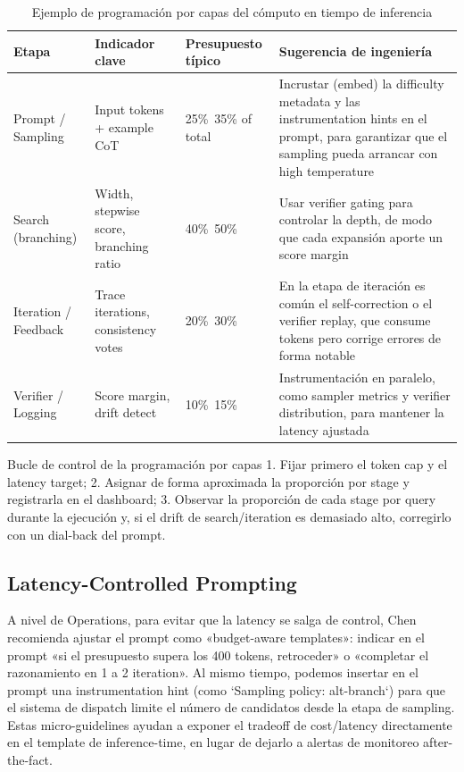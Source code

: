 \begin{table}[H]
\centering
\caption{Ejemplo de programación por capas del cómputo en tiempo de inferencia}
\begin{tabular}{p{}p{}p{}p{}}
\toprule
Etapa & Indicador clave & Presupuesto típico & Sugerencia de ingeniería \\
\midrule
Prompt / Sampling & Input tokens + example CoT & 25\%~35\% of total & Incrustar (embed) la difficulty metadata y las instrumentation hints en el prompt, para garantizar que el sampling pueda arrancar con high temperature \\
Search (branching) & Width, stepwise score, branching ratio & 40\%~50\% & Usar verifier gating para controlar la depth, de modo que cada expansión aporte un score margin \\
Iteration / Feedback & Trace iterations, consistency votes & 20\%~30\% & En la etapa de iteración es común el self-correction o el verifier replay, que consume tokens pero corrige errores de forma notable \\
Verifier / Logging & Score margin, drift detect & 10\%~15\% & Instrumentación en paralelo, como sampler metrics y verifier distribution, para mantener la latency ajustada \\
\bottomrule
\end{tabular}
\end{table}

\begin{knowledgebox}{Bucle de control de la programación por capas}
1. Fijar primero el token cap y el latency target; 2. Asignar de forma aproximada la proporción por stage y registrarla en el dashboard; 3. Observar la proporción de cada stage por query durante la ejecución y, si el drift de search/iteration es demasiado alto, corregirlo con un dial-back del prompt.
\end{knowledgebox}

\subsection{Latency-Controlled Prompting}
A nivel de Operations, para evitar que la latency se salga de control, Chen recomienda ajustar el prompt como «budget-aware templates»: indicar en el prompt «si el presupuesto supera los 400 tokens, retroceder» o «completar el razonamiento en 1 a 2 iteration». Al mismo tiempo, podemos insertar en el prompt una instrumentation hint (como `Sampling policy: alt-branch`) para que el sistema de dispatch limite el número de candidatos desde la etapa de sampling. Estas micro-guidelines ayudan a exponer el tradeoff de cost/latency directamente en el template de inference-time, en lugar de dejarlo a alertas de monitoreo after-the-fact.

